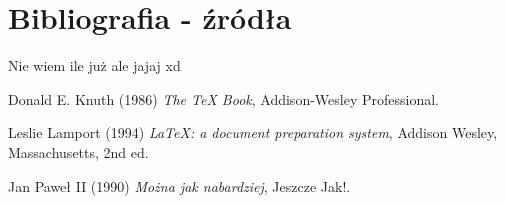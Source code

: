 
\section{Bibliografia - źródła }

Nie wiem ile już ale jajaj xd

\begin{thebibliography}{9}
    Donald E. Knuth (1986) \emph{The \TeX{} Book}, Addison-Wesley Professional.
    
    
    Leslie Lamport (1994) \emph{\LaTeX: a document preparation system}, Addison
    Wesley, Massachusetts, 2nd ed.

    Jan Paweł II (1990) \emph{Można jak nabardziej}, Jeszcze Jak!.

\end{thebibliography}
